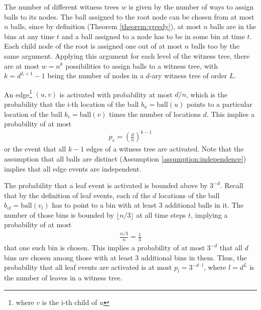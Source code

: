 \documentclass[a4paper,12pt]{article}
\begin{document}
The number of different witness trees $w$ is given by the number of ways to assign balls to its nodes. The ball assigned to the root node can be chosen from at most $n$ balls, since by definition (Theorem \ref{theorem:greedy}), at most $n$ balls are in the bins at any time $t$ and a ball assigned to a node has to be in some bin at time $t$. Each child node of the root is assigned one out of at most $n$ balls too by the same argument. Applying this argument for each level of the witness tree, there are at most $w = n^k$ possibilities to assign balls to a witness tree, with $k = d^{L+1}-1$ being the number of nodes in a $d$-ary witness tree of order $L$.
 
An edge\footnote{where $v$ is the i-th child of $u$} $(u, v)$ is activated with probability at most $d/n$, which is the probability that the i-th location of the ball $b_u = \mathrm{ball}(u)$ points to a particular location of the ball $b_v = \mathrm{ball}(v)$ times the number of locations $d$. This implies a probability of at most
\begin{align}
p_e = \left(\frac{d}{n}\right)^{k-1}
\end{align} 
or the event that all $k-1$ edges of a witness tree are activated. Note that  the assumption that all balls are distinct (Assumption \ref{assumption:independence}) implies that all edge events are independent.

The probability that a leaf event is activated is bounded above by $3^{-d}$. Recall that by the definition of leaf events, each of the $d$ locations of the ball $b_{vl} = \mathrm{ball}(v_l)$ has to point to a bin with at least 3 additional balls in it. The number of those bins is bounded by $\lfloor n/3 \rfloor$ at all time steps $t$, implying a probability of at most 
\begin{align}
\frac{n/3}{n} = \frac{1}{3}
\end{align}
that one such bin is chosen. This implies a probability of at most $3^{-d}$ that all $d$ bins are chosen among those with at least 3 additional bins in them. Thus, the probability that all leaf events are activated is at most $p_l = 3^{-d\cdot l}$, where $l = d^{L}$ is the number of leaves in a witness tree.
\end{document}
